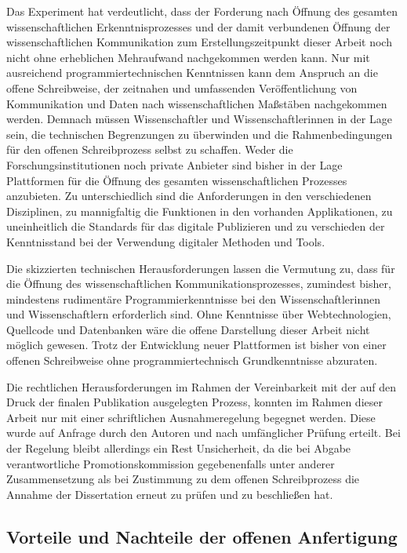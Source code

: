 Das Experiment hat verdeutlicht, dass der Forderung nach Öffnung des gesamten wissenschaftlichen Erkenntnisprozesses und der damit verbundenen Öffnung der wissenschaftlichen Kommunikation zum Erstellungszeitpunkt dieser Arbeit noch nicht ohne erheblichen Mehraufwand nachgekommen werden kann. Nur mit ausreichend programmiertechnischen Kenntnissen kann dem Anspruch an die offene Schreibweise, der zeitnahen und umfassenden Veröffentlichung von Kommunikation und Daten nach wissenschaftlichen Maßstäben nachgekommen werden. Demnach müssen Wissenschaftler und Wissenschaftlerinnen in der Lage sein, die technischen Begrenzungen zu überwinden und die Rahmenbedingungen für den offenen Schreibprozess selbst zu schaffen. Weder die Forschungsinstitutionen noch private Anbieter sind bisher in der Lage Plattformen für die Öffnung des gesamten wissenschaftlichen Prozesses anzubieten. Zu unterschiedlich sind die Anforderungen in den verschiedenen Disziplinen, zu mannigfaltig die Funktionen in den vorhanden Applikationen, zu uneinheitlich die Standards für das digitale Publizieren und zu verschieden der Kenntnisstand bei der Verwendung digitaler Methoden und Tools.

Die skizzierten technischen Herausforderungen lassen die Vermutung zu, dass für die Öffnung des wissenschaftlichen Kommunikationsprozesses, zumindest bisher, mindestens rudimentäre Programmierkenntnisse bei den Wissenschaftlerinnen und Wissenschaftlern erforderlich sind. Ohne Kenntnisse über Webtechnologien, Quellcode und Datenbanken wäre die offene Darstellung dieser Arbeit nicht möglich gewesen. Trotz der Entwicklung neuer Plattformen ist bisher von einer offenen Schreibweise ohne programmiertechnisch Grundkenntnisse abzuraten.

Die rechtlichen Herausforderungen im Rahmen der Vereinbarkeit mit der auf den Druck der finalen Publikation ausgelegten Prozess, konnten im Rahmen dieser Arbeit nur mit einer schriftlichen Ausnahmeregelung begegnet werden. Diese wurde auf Anfrage durch den Autoren und nach umfänglicher Prüfung erteilt. Bei der Regelung bleibt allerdings ein Rest Unsicherheit, da die bei Abgabe verantwortliche Promotionskommission gegebenenfalls unter anderer Zusammensetzung als bei Zustimmung zu dem offenen Schreibprozess die Annahme der Dissertation erneut zu prüfen und zu beschließen hat.

\subsection{Vorteile und Nachteile der offenen Anfertigung}

